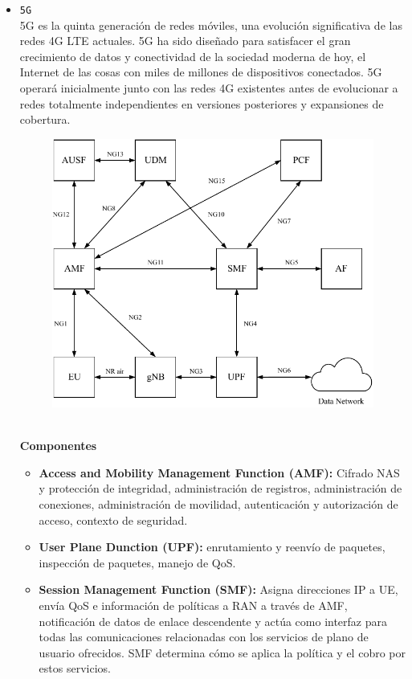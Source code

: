 \begin{itemize}
	\item {\color{red}\texttt{5G}}\\
	5G es la quinta generación de redes móviles, una evolución significativa de las redes 4G LTE actuales. 5G ha sido diseñado para satisfacer el gran crecimiento de datos y conectividad de la sociedad moderna de hoy, el Internet de las cosas con miles de millones de dispositivos conectados. 5G operará inicialmente junto con las redes 4G existentes antes de evolucionar a redes totalmente independientes en versiones posteriores y expansiones de cobertura.
		\begin{figure}[ht!]
	\centering
	\includegraphics[scale=0.8]{Imagenes/arq5G.pdf}
	\end{figure}\\
	\textbf{Componentes}
	\begin{itemize}
	\item \textbf{Access and Mobility Management Function (AMF):} Cifrado NAS y protección de integridad, administración de registros, administración de conexiones, administración de movilidad, autenticación y autorización de acceso, contexto de seguridad.
	\item \textbf{User Plane Dunction (UPF):} enrutamiento y reenvío de paquetes, inspección de paquetes, manejo de QoS.
	\item \textbf{Session Management Function (SMF):} Asigna direcciones IP a UE, envía QoS e información de políticas a RAN a través de AMF, notificación de datos de enlace descendente y actúa como interfaz para todas las comunicaciones relacionadas con los servicios de plano de usuario ofrecidos. SMF determina cómo se aplica la política y el cobro por estos servicios.

\end{itemize}
\end{itemize}
